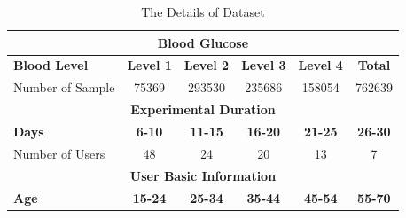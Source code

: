 \begin{table}[]
\centering
\caption{The Details of Dataset}
\label{dataset}
\begin{tabular}{clccclcccccl}
\hline\hline
\multicolumn{12}{c}{\textbf{Blood Glucose}}                                                                                                                                                                                               \\ \hline
\multicolumn{2}{l}{\textbf{\cellcolor[gray]{0.8}Blood Level}} & \multicolumn{2}{r}{\textbf{\cellcolor[gray]{0.8}Level 1}} & \multicolumn{2}{c}{\textbf{\cellcolor[gray]{0.8}Level 2}} & \multicolumn{2}{c}{\textbf{\cellcolor[gray]{0.8}Level 3}} & \multicolumn{2}{c}{\textbf{\cellcolor[gray]{0.8}Level 4}} & \multicolumn{2}{c}{\textbf{\cellcolor[gray]{0.8}Total}} \\
\multicolumn{2}{l}{Number of Sample}     & \multicolumn{2}{c}{75369}            & \multicolumn{2}{c}{293530}           & \multicolumn{2}{c}{235686}           & \multicolumn{2}{c}{158054}           & \multicolumn{2}{c}{762639}         \\ \hline\hline
\multicolumn{12}{c}{\textbf{Experimental Duration}}                                                                                                                                                                                          \\ \hline
\multicolumn{2}{l}{\textbf{\cellcolor[gray]{0.8}Days}}        & \multicolumn{2}{c}{\textbf{\cellcolor[gray]{0.8}6-10}}    & \multicolumn{2}{c}{\textbf{\cellcolor[gray]{0.8}11-15}}   & \multicolumn{2}{c}{\textbf{\cellcolor[gray]{0.8}16-20}}   & \multicolumn{2}{c}{\textbf{\cellcolor[gray]{0.8}21-25}}   & \multicolumn{2}{c}{\textbf{\cellcolor[gray]{0.8}26-30}} \\
\multicolumn{2}{l}{Number of Users}      & \multicolumn{2}{c}{48}               & \multicolumn{2}{c}{24}               & \multicolumn{2}{c}{20}               & \multicolumn{2}{c}{13}               & \multicolumn{2}{c}{7}              \\ \hline\hline
\multicolumn{12}{c}{\textbf{User Basic Information}}                                                                                                                                                                                      \\ \hline
\multicolumn{2}{l}{\textbf{\cellcolor[gray]{0.8}Age}}         & \multicolumn{2}{c}{\textbf{\cellcolor[gray]{0.8}15-24}}   & \multicolumn{2}{c}{\textbf{\cellcolor[gray]{0.8}25-34}}   & \multicolumn{2}{c}{\textbf{\cellcolor[gray]{0.8}35-44}}   & \multicolumn{2}{c}{\textbf{\cellcolor[gray]{0.8}45-54}}   & \multicolumn{2}{c}{\textbf{\cellcolor[gray]{0.8}55-70}} \\

\end{tabular}
\end{table}
